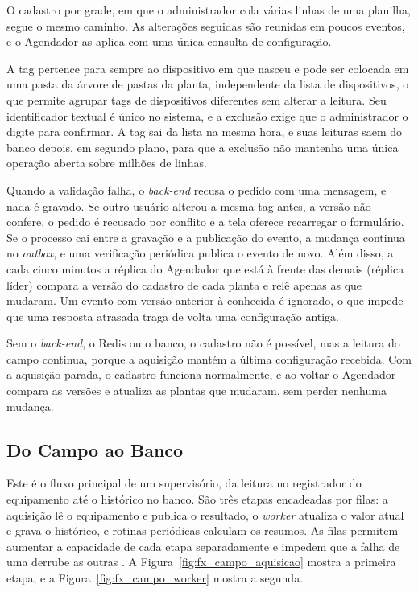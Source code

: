 \par O cadastro por grade, em que o administrador cola várias linhas de uma planilha, segue o mesmo caminho. As alterações seguidas são reunidas em poucos eventos, e o Agendador as aplica com uma única consulta de configuração.

\par A tag pertence para sempre ao dispositivo em que nasceu e pode ser colocada em uma pasta da árvore de pastas da planta, independente da lista de dispositivos, o que permite agrupar tags de dispositivos diferentes sem alterar a leitura. Seu identificador textual é único no sistema, e a exclusão exige que o administrador o digite para confirmar. A tag sai da lista na mesma hora, e suas leituras saem do banco depois, em segundo plano, para que a exclusão não mantenha uma única operação aberta sobre milhões de linhas.

\par Quando a validação falha, o \emph{back-end} recusa o pedido com uma mensagem, e nada é gravado. Se outro usuário alterou a mesma tag antes, a versão não confere, o pedido é recusado por conflito e a tela oferece recarregar o formulário. Se o processo cai entre a gravação e a publicação do evento, a mudança continua no \emph{outbox}, e uma verificação periódica publica o evento de novo. Além disso, a cada cinco minutos a réplica do Agendador que está à frente das demais (réplica líder) compara a versão do cadastro de cada planta e relê apenas as que mudaram. Um evento com versão anterior à conhecida é ignorado, o que impede que uma resposta atrasada traga de volta uma configuração antiga.

\par Sem o \emph{back-end}, o Redis ou o banco, o cadastro não é possível, mas a leitura do campo continua, porque a aquisição mantém a última configuração recebida. Com a aquisição parada, o cadastro funciona normalmente, e ao voltar o Agendador compara as versões e atualiza as plantas que mudaram, sem perder nenhuma mudança.

\subsection{Do Campo ao Banco}

\par Este é o fluxo principal de um supervisório, da leitura no registrador do equipamento até o histórico no banco. São três etapas encadeadas por filas: a aquisição lê o equipamento e publica o resultado, o \emph{worker} atualiza o valor atual e grava o histórico, e rotinas periódicas calculam os resumos. As filas permitem aumentar a capacidade de cada etapa separadamente e impedem que a falha de uma derrube as outras \cite{BULLMQ_DOCS}. A Figura~\ref{fig:fx_campo_aquisicao} mostra a primeira etapa, e a Figura~\ref{fig:fx_campo_worker} mostra a segunda.

